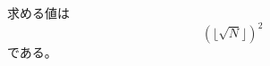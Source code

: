 \documentclass{article}
\begin{document}
求める値は
\begin{equation*}
    ( \lfloor \sqrt{N} \rfloor )^2
\end{equation*}
である。
\end{document}
